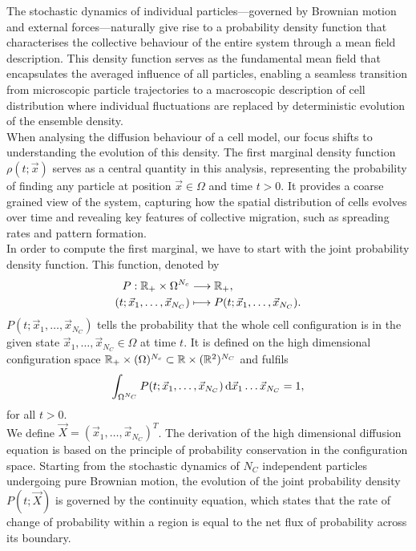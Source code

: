 The stochastic dynamics of individual particles—governed by Brownian motion and external forces—naturally give rise to a probability density function that characterises the collective behaviour of the entire system through a mean field description. 
This density function serves as the fundamental mean field that encapsulates the averaged influence of all particles, enabling a seamless transition from microscopic particle trajectories to a macroscopic description of cell distribution where individual fluctuations are replaced by deterministic evolution of the ensemble density. \\
When analysing the diffusion behaviour of a cell model, our focus shifts to understanding the evolution of this density. 
The first marginal density function $\rho(t; \vec{x})$ serves as a central quantity in this analysis, representing the probability of finding any particle at position $\vec{x} \in \Omega$ and time $t > 0$. 
It provides a coarse grained view of the system, capturing how the spatial distribution of cells evolves over time and revealing key features of collective migration, such as spreading rates and pattern formation. \\ 
In order to compute the first marginal, we have to start with the joint probability density function. 
This function, denoted by 
\begin{align*}
	P : \mathbb{R}_{+} \times \Omega^{N_c} &\longrightarrow  \mathbb{R}_+, \\	
	(t; \vec{x}_1, \ldots, \vec{x}_{N_C}) &\longmapsto  P(t; \vec{x}_1, \ldots, \vec{x}_{N_C}).
\end{align*}	
$P(t; \vec{x}_1, \ldots, \vec{x}_{N_C})$ tells the probability that the whole cell configuration is in the given state $\vec{x}_1, \ldots, \vec{x}_{N_C} \in \Omega$ at time $t$. 
It is defined on the high dimensional configuration space $\mathbb{R}_{+} \times (\Omega)^{N_c} \subset \mathbb{R} \times (\mathbb{R}^2)^{N_C}$ and fulfils
\[
	\int_{\Omega^{N_C}} P(t; \vec{x}_1, \ldots, \vec{x}_{N_C}) \, \mathrm{d} \vec{x}_1 \ldots \vec{x}_{N_C} = 1, 
\]
for all $t>0$. \\ 
We define $\vec{X} = (\vec{x}_1, \ldots, \vec{x}_{N_C})^T$. 
The derivation of the high dimensional diffusion equation is based on the principle of probability conservation in the configuration space. Starting from the stochastic dynamics of $N_C$ independent particles undergoing pure Brownian motion, the evolution of the joint probability density $P(t; \vec{X})$ is governed by the continuity equation, which states that the rate of change of probability within a region is equal to the net flux of probability across its boundary. \\ 
